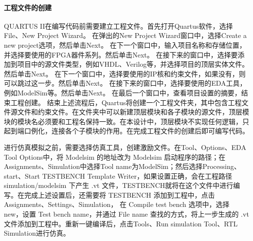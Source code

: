 \paragraph{工程文件的创建}
QUARTUS II在编写代码前需要建立工程文件。首先打开Quartus软件，选择File、New Project Wizard。
在弹出的New Project Wizard窗口中，选择Create a new project选项，然后单击Next。
在下一个窗口中，输入项目名称和存储位置，并选择要使用的FPGA器件系列。然后单击Next。
在接下来的窗口中，选择要添加到项目中的源文件类型，例如VHDL、Verilog等，并选择项目的顶层实体文件。然后单击Next。
在下一个窗口中，选择要使用的IP核和约束文件，如果没有，则可以跳过这一步。然后单击Next。
在接下来的窗口中，选择要使用的EDA工具，例如ModelSim等。然后单击Next。
在最后一个窗口中，查看项目设置的摘要，结束工程创建。
结束上述流程后，Quartus将创建一个工程文件夹，其中包含工程文件源文件和约束文件。在文件夹中可以新建顶层模块和各子模块的源文件，顶层模块的模块名必须要和工程名保持一致。在本设计中，顶层模块不实现任何逻辑，只起到端口例化，连接各个子模块的作用。在完成工程文件的创建后即可编写代码。\par
进行仿真模拟之前，需要选择仿真工具，创建激励文件。在Tool、Options、EDA Tool Options中，将 Modelsim 的地址改为 Modelsim 启动程序的路径；在Assignments、Simulation中选择Tool name为ModelSim；然后选择Processing、start、Start TESTBENCH Template Writer，如果设置正确，会在工程路径 simulation/modelsim 下产生 .vt 文件，TESTBENCH就将在这个文件中进行编写。在完成上述设置后，还需要将 TESTBENCH 添加到工程中，点击Assignments、Settings、Simulation，
在 Compile test bench 选项中，选择 new，设置 Test bench name，并通过 File name 查找的方式，将上一步生成的 .vt 文件添加到工程中。重新一键编译后，点击Tools、Run simulation Tool、RTL Simulation进行仿真。


